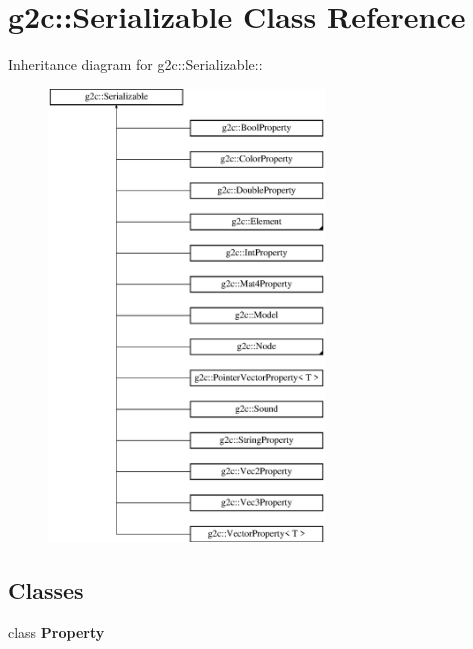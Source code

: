 \hypertarget{classg2c_1_1_serializable}{
\section{g2c::Serializable Class Reference}
\label{classg2c_1_1_serializable}
}
Inheritance diagram for g2c::Serializable::\begin{figure}[H]
\begin{center}
\leavevmode
\includegraphics[height=12cm]{classg2c_1_1_serializable}
\end{center}
\end{figure}
\subsection*{Classes}
\begin{DoxyCompactItemize}
\item 
class {\bfseries Property}
\end{DoxyCompactItemize}

